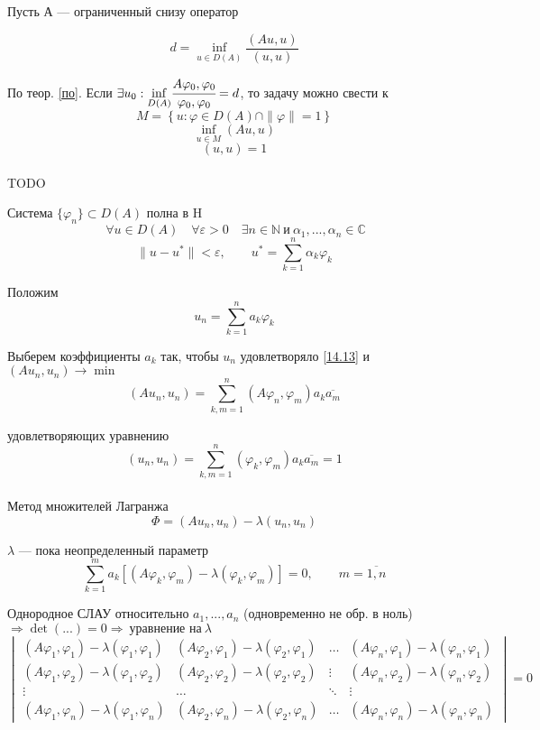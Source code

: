 \documentclass[12pt, a4paper]{article}
\newcommand{\Sum}{\sum\limits}
\begin{document}
Пусть А --- ограниченный снизу оператор

\[ d = \underset{u \in D(A)}{\inf} \frac{(Au, u)}{(u, u)} \label{14.11} \tag{14.11} \] 

По теор. \eqref{по}. Если $ \exists u_0 : \underset{D(A)}{\inf} \cfrac{A \varphi_0, \varphi_0}{\varphi_0, \varphi_0} = d$, то задачу можно свести к
\[ M = \left\{ u: \varphi \in D(A) \cap	 \|\varphi\|=1 \right\} \]
\[ \underset{u \in M}{\inf} (Au, u) \label{14.12} \tag{14.12} \]
\[ (u, u) = 1 \label{14.13} \tag{14.13} \] \\

TODO

Система $ \{ \varphi_n \} \subset D(A)$ полна в H
\[\ \forall u \in D(A) \quad \forall \varepsilon > 0 \quad \exists n \in \mathbb{N} \ \text{и} \ \alpha_1, ... , \alpha_n \in \mathbb{C} \]
\[ \|u - u^*\| < \varepsilon, \qquad u^* = \Sum_{k=1}^{n} \alpha_k \varphi_k \]

Положим
\[ u_n = \Sum_{k=1}^{n} a_k \varphi_k \]

Выберем коэффициенты $a_k$ так, чтобы $u_n$ удовлетворяло \eqref{14.13} и $ (Au_n, u_n) \rightarrow \min $
\[ (A u_n, u_n) = \Sum_{k,m = 1}^{n} (A \varphi_n, \varphi_m) a_k \overline{a_m} \]

удовлетворяющих уравнению
\[ (u_n, u_n) = \Sum_{k, m=1}^{n} (\varphi_k, \varphi_m) a_k \overline{a_m} = 1 \label{14.14} \tag{14.14} \] \\

Метод множителей Лагранжа
\[ \Phi = (A u_n, u_n) - \lambda (u_n, u_n) \]

$ \lambda  $ --- пока неопределенный параметр
\[ \Sum_{k=1}^{m} a_k \left[(A \varphi_k, \varphi_m) - \lambda (\varphi_k, \varphi_m)\right] = 0, \qquad m= \overline{1,n} \label{14.15} \tag{14.15} \]

Однородное СЛАУ относительно $ a_1, ... , a_n $ (одновременно не обр. в ноль) $ \Rightarrow \det (...) = 0 \Rightarrow \ \text{уравнение на} \ \lambda $
\[ \begin{vmatrix}
	(A\varphi_1, \varphi_1) - \lambda (\varphi_1, \varphi_1) & (A\varphi_2, \varphi_1) - \lambda (\varphi_2, \varphi_1) & \dots & (A\varphi_n, \varphi_1) - \lambda (\varphi_n, \varphi_1) \\
	(A\varphi_1, \varphi_2) - \lambda (\varphi_1, \varphi_2) & (A\varphi_2, \varphi_2) - \lambda (\varphi_2, \varphi_2) & \vdots & (A\varphi_n, \varphi_2) - \lambda (\varphi_n, \varphi_2) \\ 
	\vdots & \dots & \ddots & \vdots \\
	(A\varphi_1, \varphi_n) - \lambda (\varphi_1, \varphi_n) & (A\varphi_2, \varphi_n) - \lambda (\varphi_2, \varphi_n) & \dots & (A\varphi_n, \varphi_n) - \lambda (\varphi_n, \varphi_n)
\end{vmatrix}
= 0 \label{14.16} \tag{14.16} \]
\end{document}
